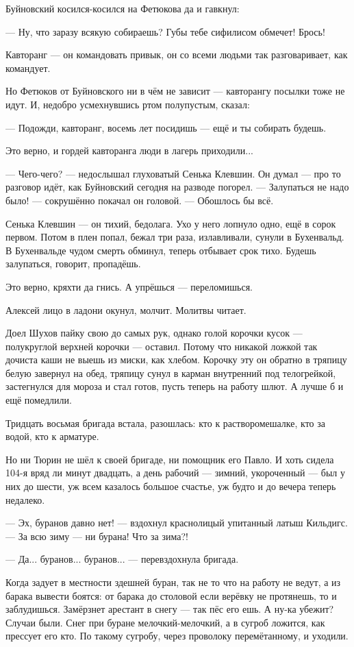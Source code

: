 Буйновский косился-косился на Фетюкова да и гавкнул:

--- Ну, что заразу всякую собираешь? Губы тебе сифилисом обмечет! Брось!

Кавторанг --- он командовать привык, он со всеми людьми так разговаривает, как командует.

Но Фетюков от Буйновского ни в чём не зависит --- кавторангу посылки тоже не идут. И, недобро
усмехнувшись ртом полупустым, сказал:

--- Подожди, кавторанг, восемь лет посидишь --- ещё и ты собирать будешь.

Это верно, и гордей кавторанга люди в лагерь приходили...

--- Чего-чего? --- недослышал глуховатый Сенька Клевшин. Он думал --- про то разговор идёт, как
Буйновский сегодня на разводе погорел. --- Залупаться не надо было! --- сокрушённо покачал он
головой. --- Обошлось бы всё.

Сенька Клевшин --- он тихий, бедолага. Ухо у него лопнуло одно, ещё в сорок первом. Потом в плен
попал, бежал три раза, излавливали, сунули в Бухенвальд. В Бухенвальде чудом смерть обминул,
теперь отбывает срок тихо. Будешь залупаться, говорит, пропадёшь.

Это верно, кряхти да гнись. А упрёшься --- переломишься.

Алексей лицо в ладони окунул, молчит. Молитвы читает.

Доел Шухов пайку свою до самых рук, однако голой корочки кусок --- полукруглой верхней
корочки --- оставил. Потому что никакой ложкой так дочиста каши не выешь из миски, как хлебом.
Корочку эту он обратно в тряпицу белую завернул на обед, тряпицу сунул в карман внутренний
под телогрейкой, застегнулся для мороза и стал готов, пусть теперь на работу шлют. А лучше б и
ещё помедлили.

Тридцать восьмая бригада встала, разошлась: кто к растворомешалке, кто за водой, кто к
арматуре.

Но ни Тюрин не шёл к своей бригаде, ни помощник его Павло. И хоть сидела 104-я вряд ли минут
двадцать, а день рабочий --- зимний, укороченный --- был у них до шести, уж всем казалось большое
счастье, уж будто и до вечера теперь недалеко.

--- Эх, буранов давно нет! --- вздохнул краснолицый упитанный латыш Кильдигс. --- За всю зиму --- ни
бурана! Что за зима?!

--- Да... буранов... буранов... --- перевздохнула бригада.

Когда задует в местности здешней буран, так не то что на работу не ведут, а из барака вывести
боятся: от барака до столовой если верёвку не протянешь, то и заблудишься. Замёрзнет
арестант в снегу --- так пёс его ешь. А ну-ка убежит? Случаи были. Снег при буране
мелочкий-мелочкий, а в сугроб ложится, как прессует его кто. По такому сугробу, через
проволоку перемётанному, и уходили.

